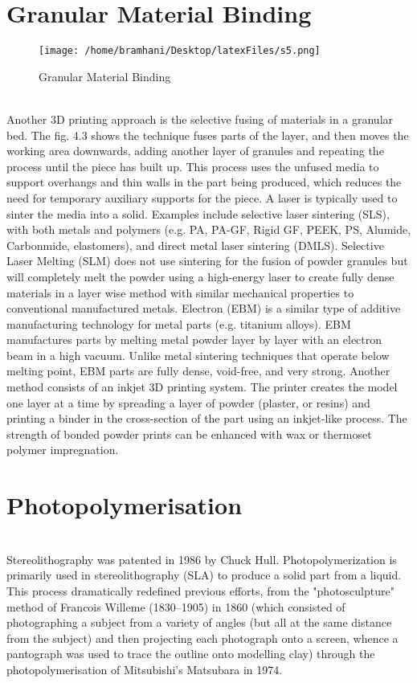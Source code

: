 \documentclass[12pt,a4paper]{report}
\begin{document}
	\section{Granular Material Binding}
	\begin{figure}[H]
		\centering
		\texttt{[image: /home/bramhani/Desktop/latexFiles/s5.png]}
		\label{fig:Granular Material Binding}
		\caption{Granular Material Binding}
	\end{figure}
	\indent
	\\Another 3D printing approach is the selective fusing of materials in a granular bed. The fig.
	4.3 shows the technique fuses parts of the layer, and then moves the working area downwards,
	adding another layer of granules and repeating the process until the piece has built up. This process
	uses the unfused media to support overhangs and thin walls in the part being produced, which
	reduces the need for temporary auxiliary supports for the piece. A laser is typically used to sinter
	the media into a solid. Examples include selective laser sintering (SLS), with both metals and
	polymers (e.g. PA, PA-GF, Rigid GF, PEEK, PS, Alumide, Carbonmide, elastomers), and direct
	metal laser sintering (DMLS). Selective Laser Melting (SLM) does not use sintering for the fusion
	of powder granules but will completely melt the powder using a high-energy laser to create fully
	dense materials in a layer wise method with similar mechanical properties to conventional
	manufactured metals. Electron (EBM) is a similar type of additive manufacturing technology for
	metal parts (e.g. titanium alloys). EBM manufactures parts by melting metal powder layer by layer
	with an electron beam in a high vacuum. Unlike metal sintering techniques that operate below
	melting point, EBM parts are fully dense, void-free, and very strong. Another method consists of an
	inkjet 3D printing system. The printer creates the model one layer at a time by spreading a layer of
	powder (plaster, or resins) and printing a binder in the cross-section of the part using an inkjet-like
	process. The strength of bonded powder prints can be enhanced with wax or thermoset polymer
	impregnation.\par
	\section{Photopolymerisation}
	
	\indent
	\\Stereolithography was patented in 1986 by Chuck Hull. Photopolymerization is primarily
	used in stereolithography (SLA) to produce a solid part from a liquid. This process dramatically
	redefined previous efforts, from the "photosculpture" method of Francois Willeme (1830–1905) in
	1860 (which consisted of photographing a subject from a variety of angles (but all at the same
	distance from the subject) and then projecting each photograph onto a screen, whence a pantograph
	was used to trace the outline onto modelling clay) through the photopolymerisation of Mitsubishi's
	Matsubara in 1974.\par
	
\end{document}
